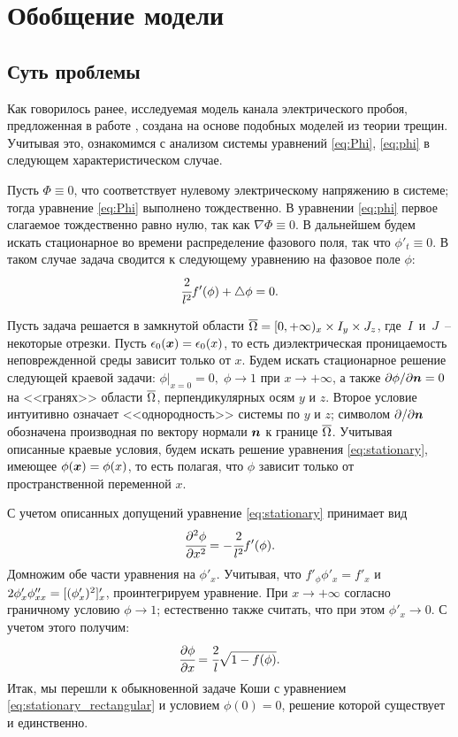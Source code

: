 
\section{Обобщение модели}

\subsection{Суть проблемы}
\label{ssec:matter_of_problem}

Как говорилось ранее, исследуемая модель канала электрического пробоя, предложенная в работе \cite{pitike_dielectric_breakdown}, создана на основе подобных моделей из теории трещин. Учитывая это, ознакомимся с анализом системы уравнений \eqref{eq:Phi}, \eqref{eq:phi} в следующем характеристическом случае.

Пусть $\Phi \equiv 0$, что соответствует нулевому электрическому напряжению в системе; тогда уравнение \eqref{eq:Phi} выполнено тождественно. В уравнении \eqref{eq:phi} первое слагаемое тождественно равно нулю, так как $\nabla \Phi \equiv 0$. В дальнейшем будем искать стационарное во времени распределение фазового поля, так что $\phi'_t \equiv 0$. В таком случае задача сводится к следующему уравнению на фазовое поле $\phi$:
\begin{equation}
	\cfrac{2}{l^2} f'(\phi) + \triangle \phi = 0 {\text{.}}
	\label{eq:stationary}
\end{equation}

Пусть задача решается в замкнутой области ${\overline{\Omega}} = [0, +\infty)_x \times I_y \times J_z$, где~$I$~и~$J$~-- некоторые отрезки. Пусть $\epsilon_0({\boldsymbol{x}}) = \epsilon_0(x)$, то есть диэлектрическая проницаемость неповрежденной среды зависит только от $x$. Будем искать стационарное решение следующей краевой задачи: $\phi|_{x = 0} = 0, \; \phi \to 1$ при $x \to +\infty$, а также $\partial \phi / \partial {\boldsymbol{n}} = 0$ на <<гранях>> области ${\overline{\Omega}}$, перпендикулярных осям $y$ и $z$. Второе условие интуитивно означает <<однородность>> системы по $y$ и $z$; символом $\partial  / \partial {\boldsymbol{n}}$ обозначена производная по вектору нормали ${\boldsymbol{n}}$ к границе ${\overline{\Omega}}$. Учитывая описанные краевые условия, будем искать решение уравнения \eqref{eq:stationary}, имеющее $\phi({\boldsymbol{x}}) = \phi(x)$, то есть полагая, что $\phi$ зависит только от пространственной переменной $x$.

С учетом описанных допущений уравнение \eqref{eq:stationary} принимает вид
$$\cfrac{\partial^2 \phi}{\partial {x}^2} = -\cfrac{2}{l^2} f'(\phi) {\text{.}}$$
Домножим обе части уравнения на $\phi'_x$. Учитывая, что $f'_\phi \phi'_x = f'_x$ и $2 \phi'_x \phi''_{xx} \hm = [(\phi'_x)^2]'_x$, проинтегрируем уравнение. При $x \to +\infty$ согласно граничному условию $\phi \to 1$; естественно также считать, что при этом $\phi'_x \to 0$. С учетом этого получим:
\begin{equation}
	\cfrac{\partial \phi}{\partial x} = \cfrac{2}{l} \sqrt{1 - f(\phi)} {\text{.}}
	\label{eq:stationary_rectangular}
\end{equation}
Итак, мы перешли к обыкновенной задаче Коши с уравнением \eqref{eq:stationary_rectangular} и условием $\phi(0) = 0$, решение которой существует и единственно.

